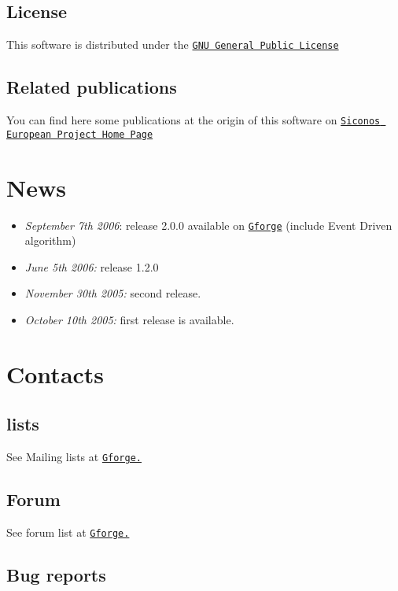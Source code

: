 \hypertarget{index_license}{}\subsection{License}\label{index_license}
This software is distributed under the \href{http://www.gnu.org/copyleft/gpl.html}{\tt GNU General Public License} \hypertarget{index_publi}{}\subsection{Related publications}\label{index_publi}
You can find here some publications at the origin of this software on \href{http://siconos.inrialpes.fr/}{\tt Siconos European Project Home Page} \hypertarget{index_news}{}\section{News}\label{index_news}
\begin{itemize}
\item {\em  September 7th 2006\/}: release 2.0.0 available on \href{http://gforge.inria.fr/projects/siconos}{\tt Gforge} (include Event Driven algorithm)\item {\em  June 5th 2006:\/} release 1.2.0\item {\em  November 30th 2005:\/} second release.\item {\em  October 10th 2005:\/} first release is available. \end{itemize}
\hypertarget{index_contacts}{}\section{Contacts}\label{index_contacts}
\hypertarget{index_Mailing}{}\subsection{lists}\label{index_Mailing}
See Mailing lists at \href{https://gforge.inria.fr/mail/?group_id=9}{\tt Gforge.} \hypertarget{index_forum}{}\subsection{Forum}\label{index_forum}
See forum list at \href{https://gforge.inria.fr/forum/?group_id=9}{\tt Gforge.} \hypertarget{index_bug}{}\subsection{Bug reports}\label{index_bug}
